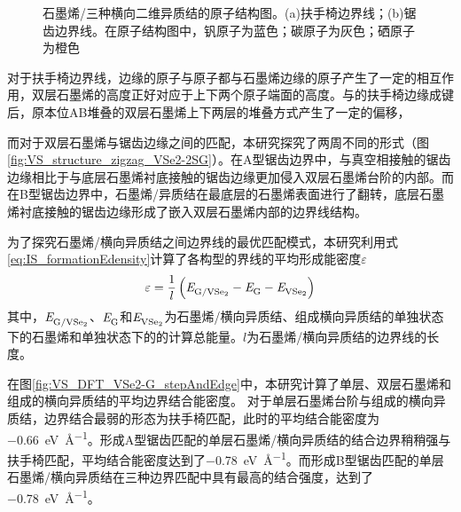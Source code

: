 \begin{figure}[htb]
{            \label{fig:VS_structure_zigzag_VSe2-2SG}
        }
        \caption{石墨烯/三种横向二维异质结的原子结构图。(a)扶手椅边界线；(b)锯齿边界线。在原子结构图中，钒原子为蓝色；碳原子为灰色；硒原子为橙色}
        \label{fig:VS_structure_ac_zz}
    \end{figure}
    
    对于扶手椅边界线，边缘的原子与原子都与石墨烯边缘的原子产生了一定的相互作用，双层石墨烯的高度正好对应于上下两个原子端面的高度。与的扶手椅边缘成键后，原本位AB堆叠的双层石墨烯上下两层的堆叠方式产生了一定的偏移，

    而对于双层石墨烯与锯齿边缘之间的匹配，本研究探究了两周不同的形式（图\ref{fig:VS_structure_zigzag_VSe2-2SG}）。在A型锯齿边界中，与真空相接触的锯齿边缘相比于与底层石墨烯衬底接触的锯齿边缘更加侵入双层石墨烯台阶的内部。而在B型锯齿边界中，石墨烯/异质结在最底层的石墨烯表面进行了翻转，底层石墨烯衬底接触的锯齿边缘形成了嵌入双层石墨烯内部的边界线结构。

    为了探究石墨烯/横向异质结之间边界线的最优匹配模式，本研究利用式\eqref{eq:IS_formationEdensity}计算了各构型的界线的平均形成能密度$\varepsilon$\chinesecolon
    \begin{equation}
        \label{eq:IS_formationEdensity}
        \varepsilon = \frac{1}{l} \left( \energyVar{G/\ce{VSe2}}{} -\energyVar{G}{} -\energyVar{\ce{VSe2}}{} \right)
    \end{equation}
    其中，$\energyVar{G/\ce{VSe2}}{}$、$\it E_{\rm G}^{\rm } \it$和$\energyVar{\ce{VSe2}}{}$为石墨烯/横向异质结、组成横向异质结的单独状态下的石墨烯和单独状态下的的计算总能量。$l$为石墨烯/横向异质结的边界线的长度。
    
    在图\ref{fig:VS_DFT_VSe2-G_stepAndEdge}中，本研究计算了单层、双层石墨烯和组成的横向异质结的平均边界结合能密度。
    对于单层石墨烯台阶与组成的横向异质结，边界结合最弱的形态为扶手椅匹配，此时的平均结合能密度为\SI{-0.66}{\electronvolt\per\angstrom}。形成A型锯齿匹配的单层石墨烯/横向异质结的结合边界稍稍强与扶手椅匹配，平均结合能密度达到了\SI{-0.78}{\electronvolt\per\angstrom}。而形成B型锯齿匹配的单层石墨烯/横向异质结在三种边界匹配中具有最高的结合强度，达到了\SI{-0.78}{\electronvolt\per\angstrom}。

